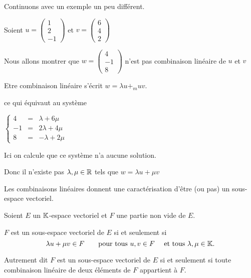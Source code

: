 Continuons avec un exemple un peu différent.

Soient $u = \left(\begin{smallmatrix}1\\ 2\\ -1\end{smallmatrix}\right)$ et $v =
  \left(\begin{smallmatrix}6\\4\\2\end{smallmatrix}\right)$

  \change
  
Nous allons montrer que $ w = \left(\begin{smallmatrix}4\\ -1\\ 8\end{smallmatrix}\right)$
  n'est pas combinaison linéaire de $u$ et $v$
  
  \change

  Etre combinaison linéaire s'écrit $w=\lambda u + _mu v$.
  
  \change
  
  ce qui équivaut au système 

  $
\left\{\begin{array}{rcl}
4 & = &\lambda + 6 \mu\\ -1 & = &2\lambda + 4\mu\\ 8 & = & -\lambda + 2\mu
\end{array}\right.$
  
  \change
  
  Ici on calcule que ce système n'a aucune solution.
  
  Donc il n'existe pas $\lambda,\mu \in \mathbb{R}$ tels que $w=\lambda u + \mu v$
  
  

\diapo

Les combinaisons linéaires donnent une caractérisation
d'être (ou pas) un sous-espace vectoriel.


Soient $E$ un $\mathbb{K}$-espace vectoriel et $F$ une partie non vide de $E$.


$F$ est un sous-espace vectoriel de $E$ si et seulement si
$$\lambda u + \mu v \in F \qquad \text{pour tous } u,v \in F \quad \text{ et tous } \lambda, \mu \in \mathbb{K}.$$

\change


Autrement dit $F$ est un sous-espace vectoriel de $E$ si et seulement si toute combinaison linéaire de deux éléments 
de $F$ appartient à $F$.

